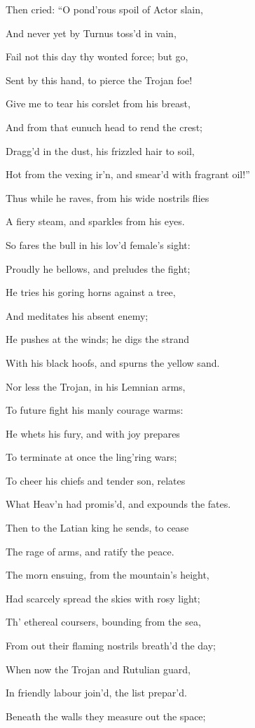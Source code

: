 Then cried: “O pond’rous spoil of Actor slain,

And never yet by Turnus toss’d in vain,

Fail not this day thy wonted force; but go,

Sent by this hand, to pierce the Trojan foe!

Give me to tear his corslet from his breast,

And from that eunuch head to rend the crest;

Dragg’d in the dust, his frizzled hair to soil,

Hot from the vexing ir’n, and smear’d with fragrant oil!”

Thus while he raves, from his wide nostrils flies

A fiery steam, and sparkles from his eyes.

So fares the bull in his lov’d female’s sight:

Proudly he bellows, and preludes the fight;

He tries his goring horns against a tree,

And meditates his absent enemy;

He pushes at the winds; he digs the strand

With his black hoofs, and spurns the yellow sand.

Nor less the Trojan, in his Lemnian arms,

To future fight his manly courage warms:

He whets his fury, and with joy prepares

To terminate at once the ling’ring wars;

To cheer his chiefs and tender son, relates

What Heav’n had promis’d, and expounds the fates.

Then to the Latian king he sends, to cease

The rage of arms, and ratify the peace.

The morn ensuing, from the mountain’s height,

Had scarcely spread the skies with rosy light;

Th’ ethereal coursers, bounding from the sea,

From out their flaming nostrils breath’d the day;

When now the Trojan and Rutulian guard,

In friendly labour join’d, the list prepar’d.

Beneath the walls they measure out the space;

